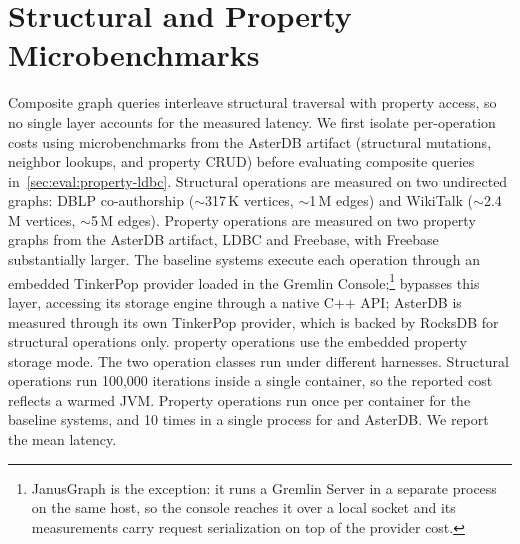 \section{Structural and Property Microbenchmarks}
\label{sec:eval:microbenchmarks}

Composite graph queries interleave structural traversal with property access, so no single layer accounts for the measured latency.
We first isolate per-operation costs using microbenchmarks from the AsterDB artifact (structural mutations, neighbor lookups, and property CRUD) before evaluating composite queries in~\autoref{sec:eval:property-ldbc}.
Structural operations are measured on two undirected graphs: DBLP co-authorship (${\sim}$317\,K vertices, ${\sim}$1\,M edges) and WikiTalk (${\sim}$2.4\,M vertices, ${\sim}$5\,M edges).
Property operations are measured on two property graphs from the AsterDB artifact, LDBC and Freebase, with Freebase substantially larger.
The baseline systems execute each operation through an embedded TinkerPop provider loaded in the Gremlin Console;\footnote{JanusGraph is the exception: it runs a Gremlin Server in a separate process on the same host, so the console reaches it over a local socket and its measurements carry request serialization on top of the provider cost.}
\project{} bypasses this layer, accessing its storage engine through a native C++ API; AsterDB is measured through its own TinkerPop provider, which is backed by RocksDB for structural operations only.
\project{} property operations use the embedded property storage mode.
The two operation classes run under different harnesses.
Structural operations run 100{,}000 iterations inside a single container, so the reported cost reflects a warmed JVM.
Property operations run once per container for the baseline systems, and 10 times in a single process for \project{} and AsterDB.
We report the mean latency.

